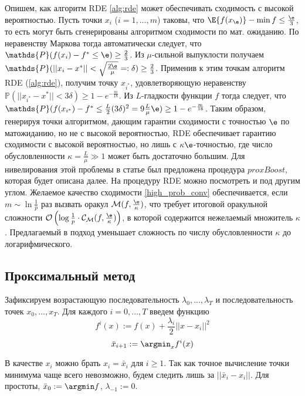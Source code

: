Опишем, как алгоритм RDE \ref{alg:rde} может обеспечивать сходимость с высокой вероятностью.
Пусть точки $x_i$ ($i = 1, ..., m$) таковы, что $\E{f(x_{\e})} - \min f \le \frac{\e}{3}$, то есть могут быть сгенерированы алгоритмом сходимости по мат. ожиданию.  По неравенству Маркова тогда автоматически следует, что $\mathds{P} (f(x_i) - f^* \le \e ) \ge \frac{2}{3}$. Из $\mu$-сильной выпуклости получаем $\mathds{P} (||x_i - x^*|| < \sqrt{\frac{2 \e}{\mu}} =: \delta) \ge \frac{2}{3}$. Применив к этим точкам алгоритм RDE (\ref{alg:rde}), получим точку $x_{i^*}$, удовлетворяющую неравенству $\mathds{P}(||x_{i^*} - x^*|| < 3 \delta) \ge 1 - e^{-\frac{m}{18}}$. Из $L$-гладкости функции $f$ тогда следует, что $\mathds{P}(f(x_{i^*}) - f^* \le \frac{L}{2}(3\delta)^2 = 9 \frac{L}{\mu}\e) \ge 1 - e^{-\frac{m}{18}}$. Таким образом, генерируя точки алгоритмом, дающим гарантии сходимости с точностью $\e$ по матожиданию, но не с высокой вероятностью, RDE обеспечивает гарантию сходимости с высокой вероятностью, но лишь с $\kappa \e$-точностью, где число обусловленности $\kappa = \frac{L}{\mu} \gg 1$ может быть достаточно большим. Для нивелирования этой проблемы в статье \cite{davis2021low} был предложена процедура $proxBoost$, которая будет описана далее. На процедуру RDE можно посмотреть и под другим углом. Желаемое качество сходимости \eqref{high_prob_conv} обеспечивается, если $m \sim \ln{\frac{1}{p}}$ раз вызвать оракул $\mathcal{M}(f, \frac{\e}{\kappa})$, что требует итоговой оракульной сложности $\mathcal{O}\left(\log{\frac{1}{p}} \cdot \mathcal{C}_{\mathcal{M}}(f, \frac{\e}{\kappa}) \right)$, в которой содержится нежелаемый множитель $\kappa$. Предлагаемый в \cite{davis2021low}
подход уменьшает сложность по числу обусловленности $\kappa$ до логарифмического.
\subsection{Проксимальный метод}
Зафиксируем возрастающую последовательность $\lambda_0, ..., \lambda_T$ и последовательность точек $x_0, ..., x_T$. Для каждого $i = 0, ..., T$ введем функцию 
\[f^i(x):=f(x) + \frac{\lambda_i}{2}||x - x_i||^2\]
\[\bar{x}_{i + 1} := \argmin_x f^i (x)\]

В качестве $x_i$ можно брать $x_i = \bar{x}_i$ для $i \ge 1$. Так как точное вычисление точки минимума чаще всего невозможно, будем следить лишь за $||\bar{x}_i - x_i||$. Для простоты, $\bar{x}_0 := \argmin f$, $\lambda_{-1} := 0$.

